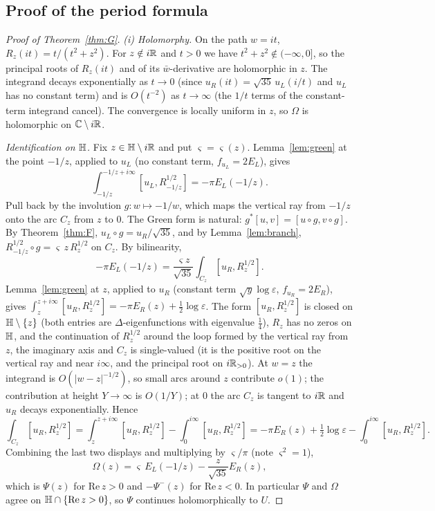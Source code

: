\subsection{Proof of the period formula}\label{sec:lzpf}
\begin{proof}[Proof of Theorem~\ref{thm:G}]
\emph{(i) Holomorphy.} On the path $w=it$, $R_z(it)=t/(t^2+z^2)$. For $z\notin i\mathbb{R}$ and $t>0$ we have $t^2+z^2\notin(-\infty,0]$, so the principal
roots of $R_z(it)$ and of its $\bar w$-derivative are holomorphic in $z$. The integrand decays exponentially as $t\to0$ (since $u_R(it)=\sqrt{35}\,u_L(i/t)$
and $u_L$ has no constant term) and is $O(t^{-2})$ as $t\to\infty$ (the $1/t$ terms of the constant-term integrand cancel). The convergence is
locally uniform in $z$, so $\Omega$ is holomorphic on $\mathbb{C}\setminus i\mathbb{R}$.

\emph{Identification on $\mathbb{H}$.} Fix $z\in\mathbb{H}\setminus i\mathbb{R}$ and put $\varsigma=\varsigma(z)$. Lemma~\ref{lem:green} at the point $-1/z$, applied to $u_L$
(no constant term, $f_{u_L}=2E_L$), gives
\[
\int_{-1/z}^{-1/z+i\infty}[u_L,R_{-1/z}^{1/2}]=-\pi E_L(-1/z).
\]
Pull back by the involution $g:w\mapsto-1/w$, which maps the vertical ray from $-1/z$ onto the arc $C_z$ from $z$ to $0$. The Green form is natural:
$g^*[u,v]=[u\circ g,v\circ g]$. By Theorem~\ref{thm:F}, $u_L\circ g=u_R/\sqrt{35}$, and by Lemma~\ref{lem:branch}, $R_{-1/z}^{1/2}\circ g=\varsigma\,z\,R_z^{1/2}$ on
$C_z$. By bilinearity,
\[
-\pi E_L(-1/z)=\frac{\varsigma z}{\sqrt{35}}\int_{C_z}[u_R,R_z^{1/2}].
\]
Lemma~\ref{lem:green} at $z$, applied to $u_R$ (constant term $\sqrt y\log\varepsilon$, $f_{u_R}=2E_R$), gives
$\int_z^{z+i\infty}[u_R,R_z^{1/2}]=-\pi E_R(z)+\tfrac12\log\varepsilon$. The form $[u_R,R_z^{1/2}]$ is closed on $\mathbb{H}\setminus\{z\}$ (both entries are
$\Delta$-eigenfunctions with eigenvalue $\tfrac14$), $R_z$ has no zeros on $\mathbb{H}$, and the continuation of $R_z^{1/2}$ around the loop formed by the vertical
ray from $z$, the imaginary axis and $C_z$ is single-valued (it is the positive root on the vertical ray and near $i\infty$, and the principal root on
$i\mathbb{R}_{>0}$). At $w=z$ the integrand is $O(|w-z|^{-1/2})$, so small arcs around $z$ contribute $o(1)$; the contribution at height $Y\to\infty$ is $O(1/Y)$;
at $0$ the arc $C_z$ is tangent to $i\mathbb{R}$ and $u_R$ decays exponentially. Hence
\[
\int_{C_z}[u_R,R_z^{1/2}]=\int_z^{z+i\infty}[u_R,R_z^{1/2}]-\int_0^{i\infty}[u_R,R_z^{1/2}]=-\pi E_R(z)+\tfrac12\log\varepsilon-\int_0^{i\infty}[u_R,R_z^{1/2}].
\]
Combining the last two displays and multiplying by $\varsigma/\pi$ (note $\varsigma^2=1$),
\[
\Omega(z)=\varsigma\,E_L(-1/z)-\frac z{\sqrt{35}}E_R(z),
\]
which is $\Psi(z)$ for $\mathrm{Re}\,z>0$ and $-\Psi^-(z)$ for $\mathrm{Re}\,z<0$. In particular $\Psi$ and $\Omega$ agree on $\mathbb{H}\cap\{\mathrm{Re}\,z>0\}$, so
$\Psi$ continues holomorphically to $U$.


\end{proof}

